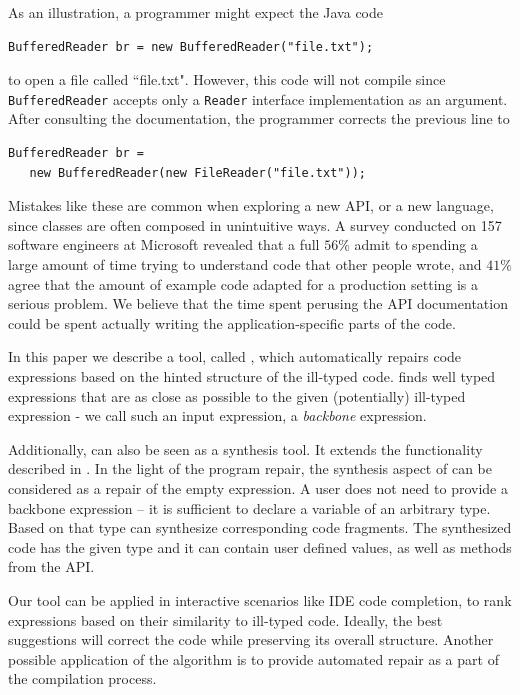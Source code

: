 As an illustration, a programmer might expect the Java code
\begin{lstlisting}
BufferedReader br = new BufferedReader("file.txt");
\end{lstlisting}
to open a file called ``file.txt". However, this code will not compile since \texttt{BufferedReader} accepts only a \texttt{Reader} interface implementation as an argument. After consulting the documentation, the programmer corrects the previous line to
\begin{lstlisting}
BufferedReader br = 
   new BufferedReader(new FileReader("file.txt"));
\end{lstlisting}
Mistakes like these are common when exploring a new API, or a new language, since classes are often composed in unintuitive ways. A survey conducted on 157 software engineers at Microsoft \cite{LaToza:2006} revealed that a full $56\%$ admit to spending a large amount of time trying to understand code that other people wrote, and $41\%$ agree that the amount of example code adapted for a production setting is a serious problem. We believe that the time spent perusing the API documentation could be spent actually writing the application-specific parts of the code. 

In this paper we describe a tool, called \ourTool, which automatically repairs code expressions based on the hinted structure of the ill-typed code. \ourTool finds well typed expressions that are as close as possible to the given (potentially) ill-typed expression - we call such an input expression, a {\em backbone} expression. 

Additionally, \ourTool can also be seen as a synthesis tool. It extends the functionality described in \cite{MandelinetALL2005Jungloid, GveroETAL13CompleteCompletionTypesWeights, PerelmanGBG12}. In the light of the program repair, the synthesis aspect of \ourTool can be considered as a repair of the empty expression. A user does not need to provide a backbone expression -- it is sufficient to declare a variable of an arbitrary type. Based on that type \ourTool can synthesize corresponding code fragments. The synthesized code has the given type and it can contain user defined values, as well as methods from the API. 

Our tool can be applied in interactive scenarios like IDE code completion, to rank expressions based on their similarity to ill-typed code. Ideally, the best suggestions will correct the code while preserving its overall structure. Another possible application of the \ourTool algorithm is to provide automated repair as a part of the compilation process.

